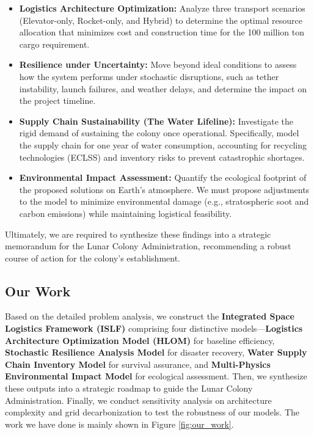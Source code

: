 \documentclass[11pt,letterpaper]{article}
\begin{document}
\begin{itemize}
    \item \textbf{Logistics Architecture Optimization:} Analyze three transport scenarios (Elevator-only, Rocket-only, and Hybrid) to determine the optimal resource allocation that minimizes cost and construction time for the 100 million ton cargo requirement.
    \item \textbf{Resilience under Uncertainty:} Move beyond ideal conditions to assess how the system performs under stochastic disruptions, such as tether instability, launch failures, and weather delays, and determine the impact on the project timeline.
    \item \textbf{Supply Chain Sustainability (The Water Lifeline):} Investigate the rigid demand of sustaining the colony once operational. Specifically, model the supply chain for one year of water consumption, accounting for recycling technologies (ECLSS) and inventory risks to prevent catastrophic shortages.
    \item \textbf{Environmental Impact Assessment:} Quantify the ecological footprint of the proposed solutions on Earth’s atmosphere. We must propose adjustments to the model to minimize environmental damage (e.g., stratospheric soot and carbon emissions) while maintaining logistical feasibility.
\end{itemize}

Ultimately, we are required to synthesize these findings into a strategic memorandum for the Lunar Colony Administration, recommending a robust course of action for the colony's establishment.
\subsection{Our Work}

Based on the detailed problem analysis, we construct the \textbf{Integrated Space Logistics Framework (ISLF)} comprising four distinctive models—\textbf{Logistics Architecture Optimization Model (HLOM)} for baseline efficiency, \textbf{Stochastic Resilience Analysis Model} for disaster recovery, \textbf{Water Supply Chain Inventory Model} for survival assurance, and \textbf{Multi-Physics Environmental Impact Model} for ecological assessment. Then, we synthesize these outputs into a strategic roadmap to guide the Lunar Colony Administration. Finally, we conduct sensitivity analysis on architecture complexity and grid decarbonization to test the robustness of our models. The work we have done is mainly shown in Figure \ref{fig:our_work}.
\end{document}
